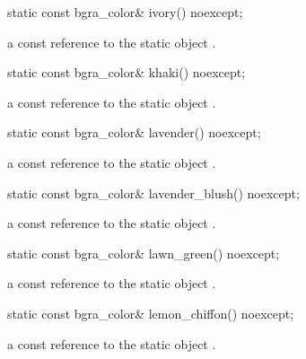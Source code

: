 \begin{itemdecl}
static const bgra_color& ivory() noexcept;
\end{itemdecl}
\begin{itemdescr}
\pnum
\returns
a const reference to the static  object .
\end{itemdescr}

\begin{itemdecl}
static const bgra_color& khaki() noexcept;
\end{itemdecl}
\begin{itemdescr}
\pnum
\returns
a const reference to the static  object .
\end{itemdescr}

\begin{itemdecl}
static const bgra_color& lavender() noexcept;
\end{itemdecl}
\begin{itemdescr}
\pnum
\returns
a const reference to the static  object .
\end{itemdescr}

\begin{itemdecl}
static const bgra_color& lavender_blush() noexcept;
\end{itemdecl}
\begin{itemdescr}
\pnum
\returns
a const reference to the static  object .
\end{itemdescr}

\begin{itemdecl}
static const bgra_color& lawn_green() noexcept;
\end{itemdecl}
\begin{itemdescr}
\pnum
\returns
a const reference to the static  object .
\end{itemdescr}

\begin{itemdecl}
static const bgra_color& lemon_chiffon() noexcept;
\end{itemdecl}
\begin{itemdescr}
\pnum
\returns
a const reference to the static  object .
\end{itemdescr}

